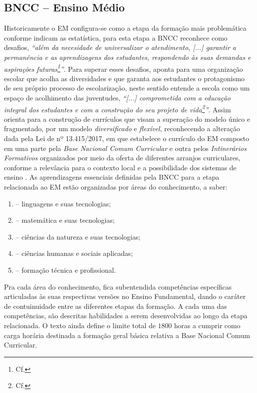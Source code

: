 \subsection{BNCC -- Ensino Médio} %
\label{sub:A BNCC e o Ensino Médio}
Historicamente o \ac{EM} configura-se como a etapa da formação mais problemática conforme indicam as estatística, para esta etapa a \ac{BNCC} reconhece como desafios,  \textit{``além da necesidade de universalizar o atendimento, [...] garantir a permanência e as aprendizagens dos estudantes, respondendo às suas demandas e aspirações futuras\footnote{Cf. }''}. Para superar esses desafios, aponta para uma organização escolar que acolha as diversidades e que garanta aos estudantes o protagonismo de seu próprio processo de escolarização, neste sentido entende a escola como um espaço de acolhimento das juventudes, \textit{``[...] comprometida com a educação integral dos estudantes e com a construção do seu projeto de vida\footnote{Cf. }''}. Assim orienta para a construção de currículos que visam a superação do modelo único e fragmentado, por um modelo \textit{diversificado} e \textit{flexível}, reconhecendo a alteração dada pela Lei de nº 13.415/2017, em que estabelece o currículo do \ac{EM} composto em uma parte pela \textit{Base Nacional Comum Curricular} e outra pelos \textit{Intinerários Formativos} organizados por meio da oferta de diferentes arranjos curriculares, conforme a relevância para o contexto local e a possibilidade dos sistemas de ensino \cite{BRASIL:2017b}. As aprendizagens essenciais definidas pela \ac{BNCC} para a etapa relacionada ao \ac{EM} estão organizadas por áreas do conhecimento, a saber:

\begin{enumerate}[label=\Roman *]
		\item – linguagens e suas tecnologias;
		\item – matemática e suas tecnologias;
		\item – ciências da natureza e suas tecnologias;
		\item – ciências humanas e sociais aplicadas;
		\item – formação técnica e profissional.
\end{enumerate}

Pra cada área do conhecimento, fica subentendida competências específicas articuladas às suas respectivas versões no Ensino Fundamental, dando o caráter de contuinuidade entre as diferentes etapas da formação. A cada uma das competências, são descritas habilidades a serem desenvolvidas ao longo da etapa relacionada. O texto ainda define o limite total de $1800$ horas a cumprir como carga horária destinada a formação geral básica relativa a Base Nacional Comum Curricular.

